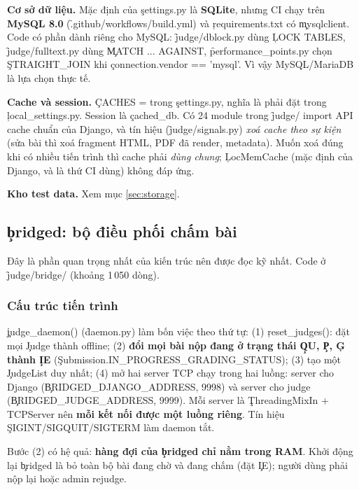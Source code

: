 \textbf{Cơ sở dữ liệu.} Mặc định của \c{settings.py} là \textbf{SQLite}, nhưng CI chạy trên \textbf{MySQL 8.0} (\f{.github/workflows/build.yml}) và \c{requirements.txt} có \c{mysqlclient}. Code có phần dành riêng cho MySQL: \f{judge/dblock.py} dùng \c{LOCK TABLES}, \f{judge/fulltext.py} dùng \c{MATCH ... AGAINST}, \f{performance_points.py} chọn \c{STRAIGHT_JOIN} khi \c{connection.vendor == 'mysql'}. Vì vậy MySQL/MariaDB là lựa chọn thực tế. \tS

\textbf{Cache và session.} \c{CACHES = {}} trong \c{settings.py}, nghĩa là phải đặt trong \c{local_settings.py}. Session là \c{cached_db}. Có 24 module trong \f{judge/} import API cache chuẩn của Django, và tín hiệu (\f{judge/signals.py}) \emph{xoá cache theo sự kiện} (sửa bài thì xoá fragment HTML, PDF đã render, metadata). Muốn xoá đúng khi có nhiều tiến trình thì cache phải \emph{dùng chung}; \c{LocMemCache} (mặc định của Django, và là thứ CI dùng) không đáp ứng. \tS \tI

\textbf{Kho test data.} Xem mục \ref{sec:storage}.

\subsection{\texorpdfstring{\c{bridged}}{bridged}: bộ điều phối chấm bài}\label{sec:bridged}
Đây là phần quan trọng nhất của kiến trúc nên được đọc kỹ nhất. Code ở \f{judge/bridge/} (khoảng 1\,050 dòng).

\subsubsection{Cấu trúc tiến trình}
\c{judge_daemon()} (\f{daemon.py}) làm bốn việc theo thứ tự: (1) \c{reset_judges()}: đặt mọi \c{Judge} thành offline; (2) \textbf{đổi mọi bài nộp đang ở trạng thái \c{QU}, \c{P}, \c{G} thành \c{IE}} (\c{Submission.IN_PROGRESS_GRADING_STATUS}); (3) tạo một \c{JudgeList} duy nhất; (4) mở hai server TCP chạy trong hai luồng: server cho Django (\c{BRIDGED_DJANGO_ADDRESS}, 9998) và server cho judge (\c{BRIDGED_JUDGE_ADDRESS}, 9999). Mỗi server là \c{ThreadingMixIn + TCPServer} nên \textbf{mỗi kết nối được một luồng riêng}. Tín hiệu \c{SIGINT/SIGQUIT/SIGTERM} làm daemon tắt. \tS

Bước (2) có hệ quả: \textbf{hàng đợi của \c{bridged} chỉ nằm trong RAM}. Khởi động lại \c{bridged} là bỏ toàn bộ bài đang chờ và đang chấm (đặt \c{IE}); người dùng phải nộp lại hoặc admin rejudge. \tS

